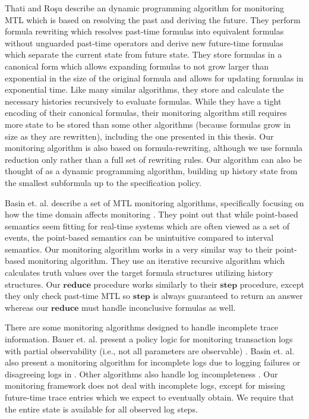 \documentclass[]{llncs}
\begin{document}
Thati and Ro\c{s}u \cite{Thati2005} describe an dynamic programming algorithm for monitoring MTL which is based on resolving the past and deriving the future. They perform formula rewriting which resolves past-time formulas into equivalent formulas without unguarded past-time operators and derive new future-time formulas which separate the current state from future state. 
They store formulas in a canonical form which allows expanding formulas to not grow larger than exponential in the size of the original formula and allows for updating formulas in exponential time. Like many similar algorithms, they store and calculate the necessary histories recursively to evaluate formulas. While they have a tight encoding of their canonical formulas, their monitoring algorithm still requires more state to be stored than some other algorithms (because formulas grow in size as they are rewritten), including the one presented in this thesis. 
%
Our monitoring algorithm is also based on formula-rewriting, although we use formula reduction only rather than a full set of rewriting rules. Our algorithm can also be thought of as a dynamic programming algorithm, building up history state from the smallest subformula up to the specification policy. 


Basin et. al. describe a set of MTL monitoring algorithms, specifically focusing on how the time domain affects monitoring \cite{Basin2012}. They point out that while point-based semantics seem fitting for real-time systems which are often viewed as a set of events, the point-based semantics can be unintuitive compared to interval semantics. Our monitoring algorithm works in a very similar way to their point-based monitoring algorithm. They use an iterative recursive algorithm which calculates truth values over the target formula structures utilizing history structures. 
Our $\mathbf{reduce}$ procedure works similarly to their $\mathbf{step}$ procedure, except they only check past-time MTL so $\mathbf{step}$ is always guaranteed to return an answer whereas our $\mathbf{reduce}$ must handle inconclusive formulas as well.

There are some monitoring algorithms designed to handle incomplete trace information. Bauer et. al. present a policy logic for monitoring transaction logs with partial observability (i.e., not all parameters are observable) \cite{Bauer2009}. Basin et. al. also present a monitoring algorithm for incomplete logs due to logging failures or disagreeing logs in \cite{Basin2013}. Other algorithms also handle log incompleteness \cite{Garg2011,Chowdhury2014}.
Our monitoring framework does not deal with incomplete logs, except for missing future-time trace entries which we expect to eventually obtain. We require that the entire state is available for all observed log steps.
\end{document}

